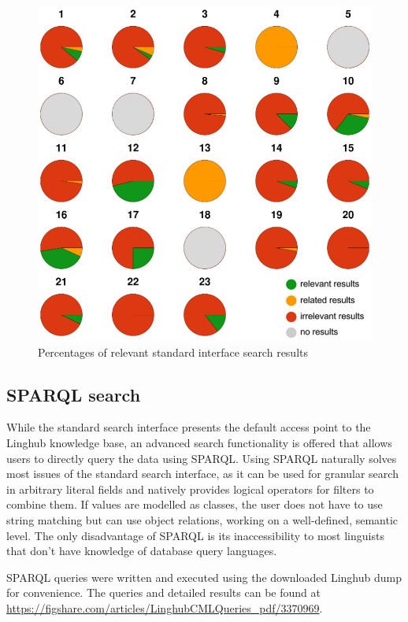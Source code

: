 \documentclass[smallextended]{svjour3}       %
\begin{document}
\begin{figure}
    \includegraphics[width=\textwidth]{eval_rel_interface.png}
    \caption{\label{fig:freetext-rel} Percentages of relevant standard interface
    search results}
\end{figure}

\subsection{SPARQL search}

While the standard search interface presents the default access point to the
Linghub knowledge base, an advanced search functionality is offered that allows
users to directly query the data using SPARQL.  Using
SPARQL naturally solves most issues of the standard search interface, as it can
be used for granular search in arbitrary literal fields and natively provides
logical operators for filters to combine them. If values are modelled as
classes, the user does not have to use string matching but can use object
relations, working on a well-defined, semantic level. The only disadvantage of
SPARQL is its inaccessibility to most linguists that don't have knowledge
of database query languages.  

SPARQL queries were written and executed using the downloaded Linghub dump for
convenience. The queries and detailed results can be found at
\url{https://figshare.com/articles/LinghubCMLQueries_pdf/3370969}.
\end{document}
